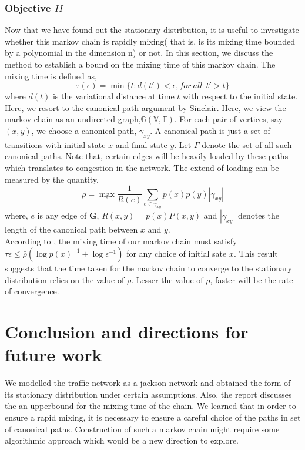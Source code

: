 \documentclass[a4paper,12pt]{scrartcl}
\begin{document}
\subsubsection*{Objective $\mathit{II}$}
Now that we have found out the stationary distribution, it is useful to investigate whether this markov chain is rapidly mixing( that is, is its mixing
time bounded by a polynomial in the dimension n) or not. In this section, we discuss the method to establish a bound on the mixing time of this markov chain. 
The mixing time is defined as,
\begin{equation}
\tau(\epsilon) = \min\{t: d(t') < \epsilon, for~all~~ t'>t \}
\end{equation}
where $d(t)$ is the variational distance at time $t$ with respect to the initial state. Here, we resort to the canonical path argument by Sinclair\cite{sinclair}. 
Here, we view the markov chain as an undirected graph,$\mathbb{G(V,E)}$. For each pair of vertices, say $(x,y) $, we choose a canonical path, $\gamma_{xy}$. A canonical path is just a set of transitions with initial state $x$ and final state $y$. Let $\Gamma$ denote the set of all such canonical paths. Note that, certain edges will be heavily loaded by these paths which translates to congestion in the network. The extend of loading can be measured by the quantity,
\begin{equation}
\bar{\rho} = \max_e \frac{1}{R(e)}\sum_{e \in \gamma_{xy}} p(x)p(y)|\gamma_{xy}|
\end{equation}
where, $e$ is any edge of $\mathbf{G}$, $R(x,y) = p(x)P(x,y)$ and $|\gamma_{xy}|$ denotes the length of the canonical path between $x$ and $y$.\\
According to \cite{sinclair}, the mixing time of our markov chain must satisfy $\tau{\epsilon} \leq \bar{\rho}(\log p(x)^{-1} + \log \epsilon^{-1})$ for any choice of initial sate $x$. This result suggests that the time taken for the markov chain to converge to the stationary distribution relies on the value of $\bar{\rho}$. Lesser the value of  $\bar{\rho}$, faster will be the rate of convergence. 
\section{Conclusion and directions for future work }
We modelled the traffic network as a jackson network and obtained the form of its stationary distribution under certain assumptions. Also, the report discusses the  an upperbound for the mixing time of the chain. We learned that in order to ensure a rapid mixing, it is necessary to ensure a careful choice of the paths in set of canonical paths. Construction of such a markov chain might require some algorithmic approach which would be a new direction to explore. 
\newpage


\end{document}
